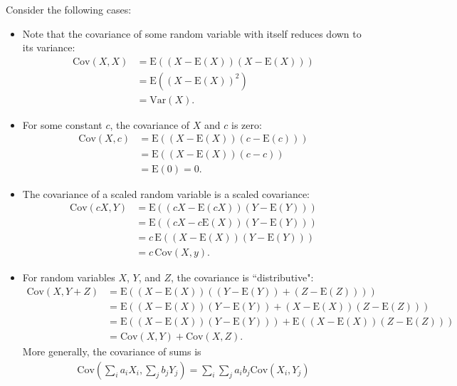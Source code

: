 \documentclass[a4paper,10pt]{article}
\newcommand{\E}{\mathrm{E}}
\newcommand{\Var}{\mathrm{Var}}
\newcommand{\Cov}{\mathrm{Cov}}
\begin{document}
Consider the following cases:
\begin{itemize}
    \item Note that the covariance of some random variable with itself reduces down to its variance:  
        \begin{align*}
            \Cov(X, X) &= \E((X-\E(X))(X-\E(X))) \\
                       &= \E((X-\E(X))^2) \\
                       &= \Var(X).
        \end{align*}

    \item For some constant $c$, the covariance of $X$ and $c$ is zero:
        \begin{align*}
            \Cov(X, c) &= \E((X - \E(X))(c-\E(c))) \\
            &= \E((X-\E(X))(c-c)) \\ 
            &= \E(0) = 0.
        \end{align*}
        
    \item The covariance of a scaled random variable is a scaled covariance:
        \begin{align*}
            \Cov(cX, Y) &= \E((cX - \E(cX))(Y - \E(Y))) \\
            &= \E((cX - c\E(X))(Y - \E(Y))) \\
            &= c\,\E((X - \E(X))(Y - \E(Y))) \\
            &= c\,\Cov(X, y).
        \end{align*}

    \item For random variables $X$, $Y$, and $Z$, the covariance is ``distributive":
        \begin{align*}
            \Cov(X, Y+Z) &= \E((X-\E(X))((Y-\E(Y)) + (Z-\E(Z)))) \\
            &= \E((X-\E(X))(Y-\E(Y)) + (X-\E(X))(Z-\E(Z))) \\
            &= \E((X-\E(X))(Y-\E(Y))) + \E((X-\E(X))(Z-\E(Z))) \\
            &= \Cov(X, Y) + \Cov(X, Z).
        \end{align*}
        More generally, the covariance of sums is
        \begin{align*}
            \Cov\left(\sum_i a_iX_i, \sum_j b_jY_j\right) = \sum_i\sum_ja_ib_j\Cov(X_i, Y_j)
        \end{align*}

\end{itemize}
\end{document}
